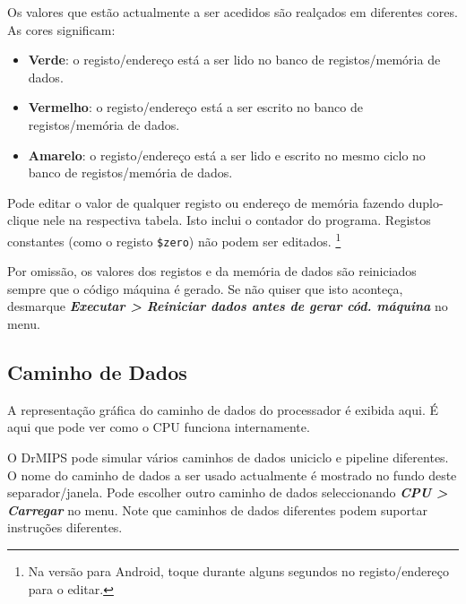 \documentclass[11pt,a4paper,twoside,titlepage]{article}
\newcommand{\menupath}[1]{\textbf{\emph{#1}}}
\begin{document}
Os valores que estão actualmente a ser acedidos são realçados em diferentes 
cores. As cores significam:
\begin{itemize}
	\item \textbf{Verde}: o registo/endereço está a ser lido no banco de
		registos/memória de dados.
	\item \textbf{Vermelho}: o registo/endereço está a ser escrito no banco de
		registos/memória de dados.
	\item \textbf{Amarelo}: o registo/endereço está a ser lido e escrito no mesmo
		ciclo no banco de registos/memória de dados.
\end{itemize}

Pode editar o valor de qualquer registo ou endereço de memória fazendo 
duplo-clique nele na respectiva tabela. Isto inclui o contador do programa.
Registos constantes (como o registo \verb+$zero+) não podem ser editados.
\footnote{Na versão para Android, toque durante alguns segundos no
registo/endereço para o editar.}

Por omissão, os valores dos registos e da memória de dados são reiniciados
sempre que o código máquina é gerado.
Se não quiser que isto aconteça, desmarque 
\menupath{Executar > Reiniciar dados antes de gerar cód. máquina} no menu.


\subsection{Caminho de Dados}

A representação gráfica do caminho de dados do processador é exibida aqui.
É aqui que pode ver como o CPU funciona internamente.

O DrMIPS pode simular vários caminhos de dados uniciclo e pipeline diferentes.
O nome do caminho de dados a ser usado actualmente é mostrado no fundo deste
separador/janela. Pode escolher outro caminho de dados seleccionando
\menupath{CPU > Carregar} no menu.
Note que caminhos de dados diferentes podem suportar instruções diferentes.
\end{document}
